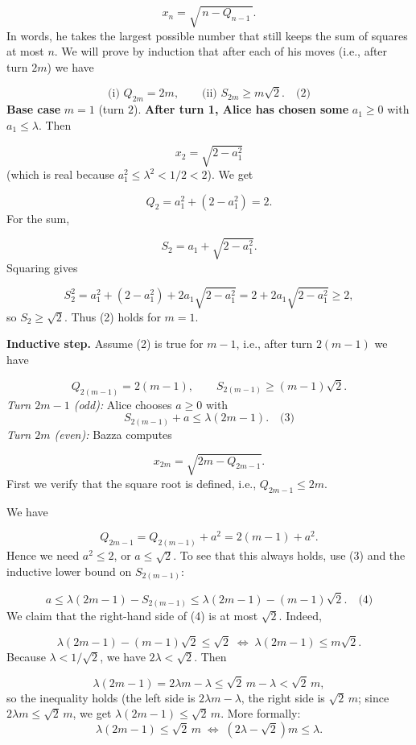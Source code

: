 \[
x_n = \sqrt{\,n - Q_{n-1}\,}.
\]
In words, he takes the largest possible number that still keeps the sum of squares at most \(n\). We will prove by induction that after each of his moves (i.e., after turn \(2m\)) we have\par
\[
\text{(i) } Q_{2m}=2m, \qquad \text{(ii) } S_{2m} \ge m\sqrt{2}. \quad\text{(2)}
\]
\textbf{Base case }\(m=1\) (turn \(2\)).\textbf{ After turn 1, Alice has chosen some }\(a_1\ge 0\) with \(a_1\le \lambda\). Then\par
\[
x_2 = \sqrt{2 - a_1^2}
\]
(which is real because \(a_1^2 \le \lambda^2 < 1/2 < 2\)). We get\par
\[
Q_2 = a_1^2 + (2 - a_1^2) = 2.
\]
For the sum,\par
\[
S_2 = a_1 + \sqrt{2 - a_1^2}.
\]
Squaring gives\par
\[
S_2^2 = a_1^2 + (2 - a_1^2) + 2a_1\sqrt{2 - a_1^2} = 2 + 2a_1\sqrt{2 - a_1^2} \ge 2,
\]
so \(S_2 \ge \sqrt{2}\). Thus (2) holds for \(m=1\).\par
\textbf{Inductive step.} Assume (2) is true for \(m-1\), i.e., after turn \(2(m-1)\) we have\par
\[
Q_{2(m-1)} = 2(m-1), \qquad S_{2(m-1)} \ge (m-1)\sqrt{2}.
\]
\emph{Turn \(2m-1\) (odd):} Alice chooses \(a \ge 0\) with
\[
S_{2(m-1)} + a \le \lambda(2m-1). \quad\text{(3)}
\]
\emph{Turn \(2m\) (even):} Bazza computes\par
\[
x_{2m} = \sqrt{2m - Q_{2m-1}}.
\]
First we verify that the square root is defined, i.e., \(Q_{2m-1} \le 2m\).\par
We have\par
\[
Q_{2m-1} = Q_{2(m-1)} + a^2 = 2(m-1) + a^2.
\]
Hence we need \(a^2 \le 2\), or \(a \le \sqrt{2}\). To see that this always holds, use (3) and the inductive lower bound on \(S_{2(m-1)}\):\par
\[
a \le \lambda(2m-1) - S_{2(m-1)} \le \lambda(2m-1) - (m-1)\sqrt{2}. \quad\text{(4)}
\]
We claim that the right-hand side of (4) is at most \(\sqrt{2}\). Indeed,\par
\[
\lambda(2m-1) - (m-1)\sqrt{2} \le \sqrt{2}
\;\Longleftrightarrow\; \lambda(2m-1) \le m\sqrt{2}.
\]
Because \(\lambda < 1/\sqrt{2}\), we have \(2\lambda < \sqrt{2}\). Then\par
\[
\lambda(2m-1) = 2\lambda m - \lambda \le \sqrt{2}\,m - \lambda < \sqrt{2}\,m,
\]
so the inequality holds (the left side is \(2\lambda m - \lambda\), the right side is \(\sqrt{2}\,m\); since \(2\lambda m \le \sqrt{2}\,m\), we get \(\lambda(2m-1) \le \sqrt{2}\,m\). More formally:
\[
\lambda(2m-1) \le \sqrt{2}\,m \;\Longleftrightarrow\; (2\lambda - \sqrt{2})m \le \lambda.
\]
